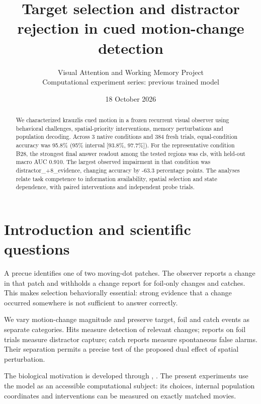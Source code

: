 \documentclass[11pt]{article}
\begin{document}
\title{\color{ink}Target selection and distractor rejection in cued motion-change detection}
\author{Visual Attention and Working Memory Project\\Computational experiment series: previous trained model}\date{18 October 2026}\maketitle
\begin{abstract}
We characterized krauzlis cued motion in a frozen recurrent visual observer using behavioral challenges, spatial-priority interventions, memory perturbations and population decoding. Across 3 native conditions and 384 fresh trials, equal-condition accuracy was 95.8\% (95\% interval [93.8\%, 97.7\%]). For the representative condition B28, the strongest final answer readout among the tested regions was cls, with held-out macro AUC 0.910. The largest observed impairment in that condition was distractor\_\allowbreak{}+8\_\allowbreak{}evidence, changing accuracy by -63.3 percentage points. The analyses relate task competence to information availability, spatial selection and state dependence, with paired interventions and independent probe trials.
\end{abstract}
\section{Introduction and scientific questions}
A precue identifies one of two moving-dot patches. The observer reports a change in that patch and withholds a change report for foil-only changes and catches. This makes selection behaviorally essential: strong evidence that a change occurred somewhere is not sufficient to answer correctly.

We vary motion-change magnitude and preserve target, foil and catch events as separate categories. Hits measure detection of relevant changes; reports on foil trials measure distractor capture; catch reports measure spontaneous false alarms. Their separation permits a precise test of the proposed dual effect of spatial perturbation.

The biological motivation is developed through \cite{arcizet}, \cite{sc}. The present experiments use the model as an accessible computational subject: its choices, internal population coordinates and interventions can be measured on exactly matched movies.
\end{document}
